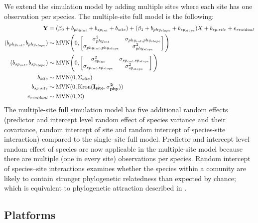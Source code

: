 \documentclass[12pt]{article}
\begin{document}
We extend the simulation model by adding multiple sites where each site has one observation per species. The multiple-site full model is the following: 
\begin{align}
{\mathbf Y} & = (\beta_0 + b_{phy_{int}} + b_{sp_{int}} + b_{site}) + (\beta_1 + b_{phy_{slope}} + b_{sp_{slope}}) X + b_{sp:site} + e_{residual} \label{eq:ms_sim}\\
(b_{phy_{int}}, b_{phy_{slope}}) & \sim \textrm{MVN} \Bigg( 0, \begin{bmatrix}
\sigma^2_{phy_{int}} & \sigma_{phy_{int},phy_{slope}} \\ 
\sigma_{phy_{int},phy_{slope}} & \sigma^2_{phy_{slope}}
\end{bmatrix}
\Bigg) \\
(b_{sp_{int}}, b_{sp_{slope}}) & \sim \textrm{MVN} \Bigg( 0, \begin{bmatrix}
\sigma^2_{sp_{int}} & \sigma_{sp_{int},sp_{slope}} \\ 
\sigma_{sp_{int},sp_{slope}} & \sigma^2_{sp_{slope}}
\end{bmatrix}
\Bigg) \\
b_{site} & \sim \textrm{MVN} ( 0 , \Sigma_{site}) \\
b_{sp:site} & \sim \textrm{MVN} (0, \textrm{Kron}(\bf{I}_{site}, \sigma^2_{phy})) \\
e_{residual} & \sim \textrm{MVN} ( 0 , \Sigma)
\end{align}
The multiple-site full simulation model has five additional random effects (predictor and intercept level random effect of species variance and their covariance, random intercept of site and random intercept of species-site interaction) compared to the single--site full model.
Predictor and intercept level random effect of species are now applicable in the multiple-site model because there are multiple (one in every site) observations per species. 
Random intercept of species--site interactions examines whether the species within a comunity are likely to contain stronger phylogenetic relatedness than expected by chance; which is equivalent to phylogenetic attraction described in \cite{helmus2007separating}. 

\subsection{Platforms}
\end{document}
